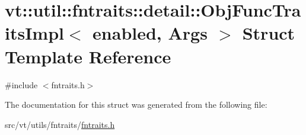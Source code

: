 \hypertarget{structvt_1_1util_1_1fntraits_1_1detail_1_1_obj_func_traits_impl}{}\section{vt\+:\+:util\+:\+:fntraits\+:\+:detail\+:\+:Obj\+Func\+Traits\+Impl$<$ enabled, Args $>$ Struct Template Reference}
\label{structvt_1_1util_1_1fntraits_1_1detail_1_1_obj_func_traits_impl}


{\ttfamily \#include $<$fntraits.\+h$>$}



The documentation for this struct was generated from the following file\+:\begin{DoxyCompactItemize}
\item 
src/vt/utils/fntraits/\hyperlink{fntraits_8h}{fntraits.\+h}\end{DoxyCompactItemize}

